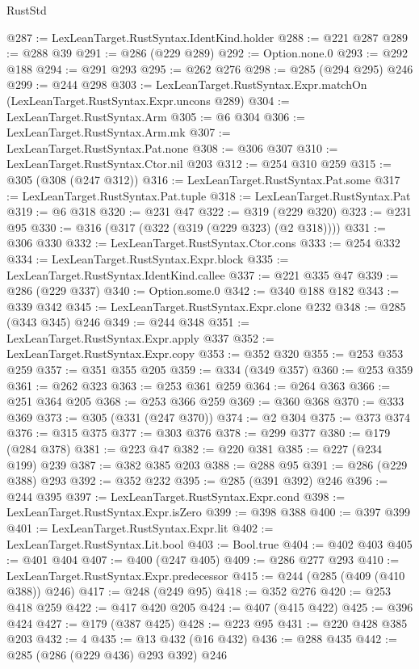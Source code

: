 \begin{lexlean}{RustStd}
\begin{coremodule}
@287 := LexLeanTarget.RustSyntax.IdentKind.holder
@288 := @221 @287
@289 := @288 @39
@291 := @286 (@229 @289)
@292 := Option.none.{0}
@293 := @292 @188
@294 := @291 @293
@295 := @262 @276
@298 := @285 (@294 @295) @246
@299 := @244 @298
@303 := LexLeanTarget.RustSyntax.Expr.matchOn (LexLeanTarget.RustSyntax.Expr.uncons @289)
@304 := LexLeanTarget.RustSyntax.Arm
@305 := @6 @304
@306 := LexLeanTarget.RustSyntax.Arm.mk
@307 := LexLeanTarget.RustSyntax.Pat.none
@308 := @306 @307
@310 := LexLeanTarget.RustSyntax.Ctor.nil @203
@312 := @254 @310 @259
@315 := @305 (@308 (@247 @312))
@316 := LexLeanTarget.RustSyntax.Pat.some
@317 := LexLeanTarget.RustSyntax.Pat.tuple
@318 := LexLeanTarget.RustSyntax.Pat
@319 := @6 @318
@320 := @231 @47
@322 := @319 (@229 @320)
@323 := @231 @95
@330 := @316 (@317 (@322 (@319 (@229 @323) (@2 @318))))
@331 := @306 @330
@332 := LexLeanTarget.RustSyntax.Ctor.cons
@333 := @254 @332
@334 := LexLeanTarget.RustSyntax.Expr.block
@335 := LexLeanTarget.RustSyntax.IdentKind.callee
@337 := @221 @335 @47
@339 := @286 (@229 @337)
@340 := Option.some.{0}
@342 := @340 @188 @182
@343 := @339 @342
@345 := LexLeanTarget.RustSyntax.Expr.clone @232
@348 := @285 (@343 @345) @246
@349 := @244 @348
@351 := LexLeanTarget.RustSyntax.Expr.apply @337
@352 := LexLeanTarget.RustSyntax.Expr.copy
@353 := @352 @320
@355 := @253 @353 @259
@357 := @351 @355 @205
@359 := @334 (@349 @357)
@360 := @253 @359
@361 := @262 @323
@363 := @253 @361 @259
@364 := @264 @363
@366 := @251 @364 @205
@368 := @253 @366 @259
@369 := @360 @368
@370 := @333 @369
@373 := @305 (@331 (@247 @370))
@374 := @2 @304
@375 := @373 @374
@376 := @315 @375
@377 := @303 @376
@378 := @299 @377
@380 := @179 (@284 @378)
@381 := @223 @47
@382 := @220 @381
@385 := @227 (@234 @199) @239
@387 := @382 @385 @203
@388 := @288 @95
@391 := @286 (@229 @388) @293
@392 := @352 @232
@395 := @285 (@391 @392) @246
@396 := @244 @395
@397 := LexLeanTarget.RustSyntax.Expr.cond
@398 := LexLeanTarget.RustSyntax.Expr.isZero
@399 := @398 @388
@400 := @397 @399
@401 := LexLeanTarget.RustSyntax.Expr.lit
@402 := LexLeanTarget.RustSyntax.Lit.bool
@403 := Bool.true
@404 := @402 @403
@405 := @401 @404
@407 := @400 (@247 @405)
@409 := @286 @277 @293
@410 := LexLeanTarget.RustSyntax.Expr.predecessor
@415 := @244 (@285 (@409 (@410 @388)) @246)
@417 := @248 (@249 @95)
@418 := @352 @276
@420 := @253 @418 @259
@422 := @417 @420 @205
@424 := @407 (@415 @422)
@425 := @396 @424
@427 := @179 (@387 @425)
@428 := @223 @95
@431 := @220 @428 @385 @203
@432 := 4
@435 := @13 @432 (@16 @432)
@436 := @288 @435
@442 := @285 (@286 (@229 @436) @293 @392) @246

\end{coremodule}
\end{lexlean}
